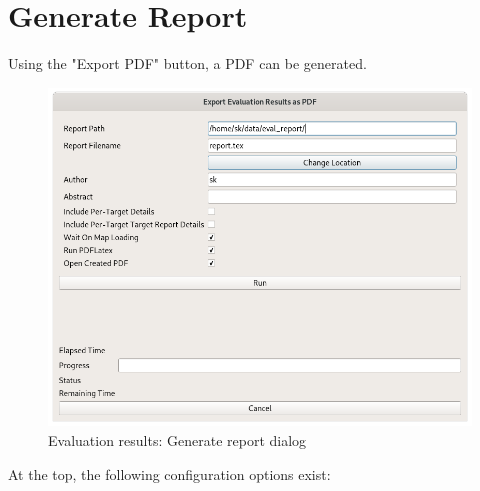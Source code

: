 \section{Generate Report}
\label{sec:eval_report}

Using the "Export PDF" button, a PDF can be generated.

\begin{figure}[H]
    \includegraphics[width=14cm]{figures/eval_report.png}
  \caption{Evaluation results: Generate report dialog}
\end{figure}

At the top, the following configuration options exist:

